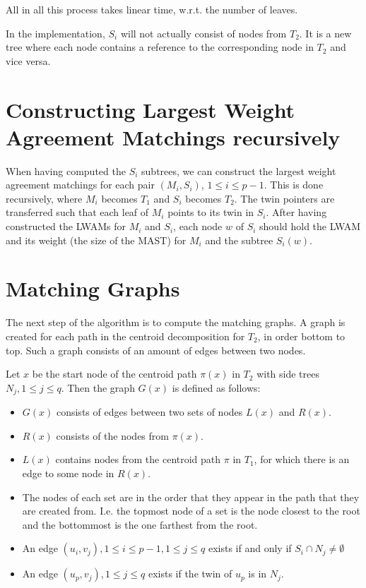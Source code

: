 All in all this process takes linear time, w.r.t. the number of leaves.

In the implementation, $S_i$ will not actually consist of nodes from $T_2$. It is a new tree where each node contains a reference to the corresponding node in $T_2$ and vice versa.

\section{Constructing Largest Weight Agreement Matchings recursively}
When having computed the $S_i$ subtrees, we can construct the largest weight agreement matchings for each pair $(M_i, S_i)$, $1 \le i \le p-1$. This is done recursively, where $M_i$ becomes $T_1$ and $S_i$ becomes $T_2$. The twin pointers are transferred such that each leaf of $M_i$ points to its twin in $S_i$. %
After having constructed the LWAMs for $M_i$ and $S_i$, each node $w$ of $S_i$ should hold the LWAM and its weight (the size of the MAST) for $M_i$ and the subtree $S_i(w)$. 

\section{Matching Graphs}
The next step of the algorithm is to compute the matching graphs. A graph is created for each path in the centroid decomposition for $T_2$, in order bottom to top. Such a graph consists of an amount of edges between two nodes.

Let $x$ be the start node of the centroid path $\pi(x)$ in $T_2$ with side trees $N_j, 1 \le j \le q$. Then the graph $G(x)$ is defined as follows:

\begin{itemize}
	\item $G(x)$ consists of edges between two sets of nodes $L(x)$ and $R(x)$.
	\item $R(x)$ consists of the nodes from $\pi(x)$.
	\item $L(x)$ contains nodes from the centroid path $\pi$ in $T_1$, for which there is an edge to some node in $R(x)$.
	\item The nodes of each set are in the order that they appear in the path that they are created from. I.e. the topmost node of a set is the node closest to the root and the bottommost is the one farthest from the root.
	\item An edge $(u_i, v_j), 1 \le i \le p-1, 1 \le j \le q$ exists if and only if $S_i \cap N_j \ne \emptyset$
	\item An edge $(u_p, v_j), 1 \le j \le q$ exists if the twin of $u_p$ is in $N_j$.
\end{itemize}

